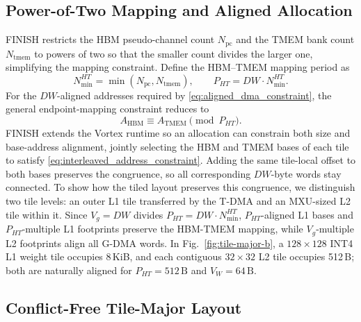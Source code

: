 \documentclass[sigconf,anonymous,nonacm]{acmart}
\newcommand{\ours}{\textsc{FINISH}}
\begin{document}
\subsection{Power-of-Two Mapping and Aligned Allocation}
\ours{} restricts the HBM pseudo-channel count $N_{\mathrm{pc}}$ and the TMEM bank count $N_{\mathrm{tmem}}$ to powers of two so that the smaller count divides the larger one, simplifying the mapping constraint. Define the HBM--TMEM mapping period as
\begin{equation}
    N_{\min}^{HT}
    =
    \min
    \left(
        N_{\mathrm{pc}},
        N_{\mathrm{tmem}}
    \right),
    \qquad
    P_{HT}
    =
    DW \cdot N_{\min}^{HT}.
    \label{eq:hbm_tmem_mapping_period}
\end{equation}
For the $DW$-aligned addresses required by \eqref{eq:aligned_dma_constraint}, the general endpoint-mapping constraint reduces to
\begin{equation}
    A_{\mathrm{HBM}}
    \equiv
    A_{\mathrm{TMEM}}
    \pmod{P_{HT}}.
    \label{eq:interleaved_address_constraint}
\end{equation}
\ours{} extends the Vortex runtime so an allocation can constrain both size and base-address alignment, jointly selecting the HBM and TMEM bases of each tile to satisfy \eqref{eq:interleaved_address_constraint}. Adding the same tile-local offset to both bases preserves the congruence, so all corresponding $DW$-byte words stay connected. 
To show how the tiled layout preserves this congruence, we distinguish two tile levels: an outer L1 tile transferred by the T-DMA and an MXU-sized L2 tile within it.
Since $V_g=DW$ divides $P_{HT}=DW\cdot N_{\min}^{HT}$, $P_{HT}$-aligned L1 bases and $P_{HT}$-multiple L1 footprints preserve the HBM-TMEM mapping, while $V_g$-multiple L2 footprints align all G-DMA words.
In Fig.~\ref{fig:tile-major-b}, a $128\times128$ INT4 L1 weight tile occupies 8\,KiB, and each contiguous $32\times32$ L2 tile occupies 512\,B; both are naturally aligned for $P_{HT}=512\,\mathrm{B}$ and $V_W=64\,\mathrm{B}$.

\subsection{Conflict-Free Tile-Major Layout}
\end{document}
